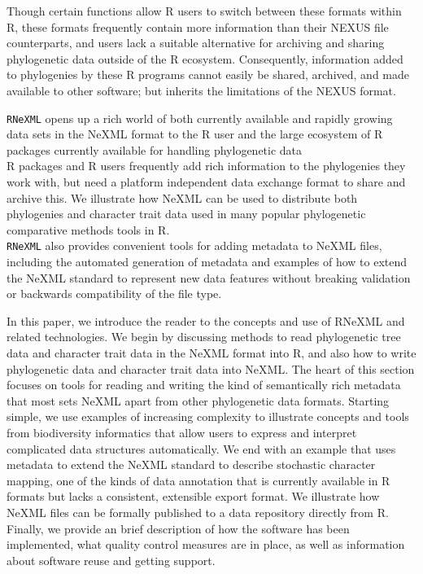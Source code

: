 \documentclass[author-year, review, 11pt]{components/elsarticle} %
\begin{document}
Though certain functions allow R users to switch between these formats
within R, these formats frequently contain more information than their
NEXUS file counterparts, and users lack a suitable alternative for
archiving and sharing phylogenetic data outside of the R ecosystem.
Consequently, information added to phylogenies by these R programs
cannot easily be shared, archived, and made available to other software;
but inherits the limitations of the NEXUS format.

\texttt{RNeXML} opens up a rich world of both currently available and
rapidly growing data sets in the NeXML format to the R user and the
large ecosystem of R packages currently available for handling
phylogenetic data\\R packages and R users frequently add rich
information to the phylogenies they work with, but need a platform
independent data exchange format to share and archive this. We
illustrate how NeXML can be used to distribute both phylogenies and
character trait data used in many popular phylogenetic comparative
methods tools in R.\\\texttt{RNeXML} also provides convenient tools for
adding metadata to NeXML files, including the automated generation of
metadata and examples of how to extend the NeXML standard to represent
new data features without breaking validation or backwards compatibility
of the file type.

In this paper, we introduce the reader to the concepts and use of RNeXML
and related technologies. We begin by discussing methods to read
phylogenetic tree data and character trait data in the NeXML format into
R, and also how to write phylogenetic data and character trait data into
NeXML. The heart of this section focuses on tools for reading and
writing the kind of semantically rich metadata that most sets NeXML
apart from other phylogenetic data formats. Starting simple, we use
examples of increasing complexity to illustrate concepts and tools from
biodiversity informatics that allow users to express and interpret
complicated data structures automatically. We end with an example that
uses metadata to extend the NeXML standard to describe stochastic
character mapping, one of the kinds of data annotation that is currently
available in R formats but lacks a consistent, extensible export format.
We illustrate how NeXML files can be formally published to a data
repository directly from R. Finally, we provide an brief description of
how the software has been implemented, what quality control measures are
in place, as well as information about software reuse and getting
support.
\end{document}
